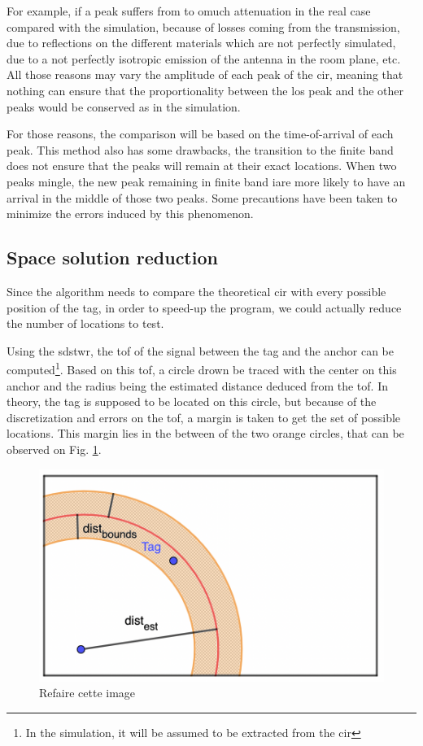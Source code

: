 For example, if a peak suffers from to omuch attenuation in the real case compared with the simulation, because of losses coming from the transmission, due to reflections on the different materials which are not perfectly simulated, due to a not perfectly isotropic emission of the antenna in the room plane, etc. All those reasons may vary the amplitude of each peak of the \gls{cir}, meaning that nothing can ensure that the proportionality between the \gls{los} peak and the other peaks would be conserved as in the simulation.
\vspace{2mm}

For those reasons, the comparison will be based on the time-of-arrival of each peak. This method also has some drawbacks, the transition to the finite band does not ensure that the peaks will remain at their exact locations. When two peaks mingle, the new peak remaining in finite band iare more likely to have an arrival in the middle of those two peaks. Some precautions have been taken to minimize the errors induced by this phenomenon.
\vspace{2mm}

\subsection{Space solution reduction}

Since the algorithm needs to compare the theoretical \gls{cir} with every possible position of the tag, in order to speed-up the program, we could actually reduce the number of locations to test.
\vspace{2mm}

Using the \gls{sdstwr}, the \gls{tof} of the signal between the tag and the anchor can be computed\footnote{In the simulation, it will be assumed to be extracted from the \gls{cir}}. Based on this \gls{tof}, a circle drown be traced with the center on this anchor and the radius being the estimated distance deduced from the \gls{tof}. In theory, the tag is supposed to be located on this circle, but because of the discretization and errors on the \gls{tof}, a margin is taken to get the set of possible locations. This margin lies in the between of the two orange circles, that can be observed on Fig. \ref{fig:speedup_1}.
\vspace{2mm}

\begin{figure}[H]
\centering
\includegraphics[width=.65\linewidth]{Images/algo_1.png}
\caption{\color{red} Refaire cette image \color{black}}
\label{fig:speedup_1}
\end{figure}


